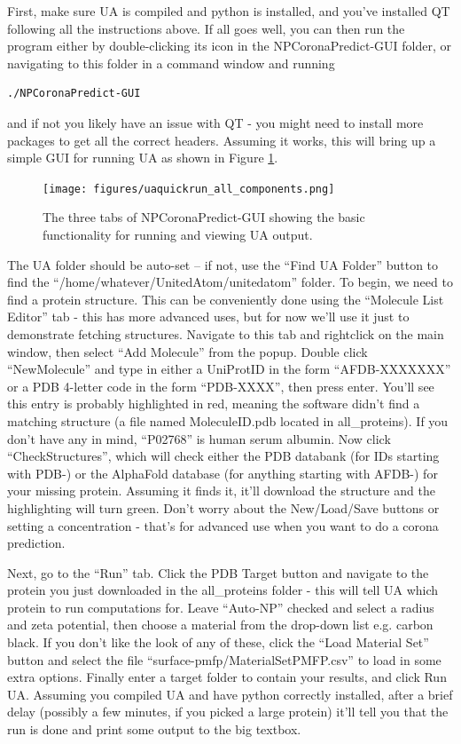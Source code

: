 \documentclass[10pt,a4paper,onecolumn]{report}
\begin{document}
First, make sure UA is compiled and python is installed, and you've installed QT following all the instructions above.  If all goes well, you can then run the program either by double-clicking its icon in the NPCoronaPredict-GUI folder, or navigating to this folder in a command window and running
\begin{lstlisting}
./NPCoronaPredict-GUI
\end{lstlisting}
and if not you likely have an issue with QT - you might need to install more packages to get all the correct headers. Assuming it works, this will bring up a simple GUI for running UA as shown in Figure \ref{fig:uaquickrun_screen}.

\begin{figure} \label{fig:uaquickrun_screen}
    \centering
    \texttt{[image: figures/uaquickrun\_all\_components.png]}
    \caption{The three tabs of NPCoronaPredict-GUI showing the basic functionality for running and viewing UA output.  }
\end{figure}

 The UA folder should be auto-set  -- if not, use the ``Find UA Folder'' button to find the ``/home/whatever/UnitedAtom/unitedatom'' folder. To begin, we need to find a protein structure. This can be conveniently done using the ``Molecule List Editor'' tab - this has more advanced uses, but for now we'll use it just to demonstrate fetching structures. Navigate to this tab and rightclick on the main window, then select ``Add Molecule'' from the popup. Double click ``NewMolecule'' and type in either a UniProtID in the form ``AFDB-XXXXXXX'' or a PDB 4-letter code in the form ``PDB-XXXX'', then press enter. You'll see this entry is probably highlighted in red, meaning the software didn't find a matching structure (a file named MoleculeID.pdb located in all\_proteins). If you don't have any in mind, ``P02768'' is human serum albumin.  Now click ``CheckStructures'', which will check either the PDB databank (for IDs starting with PDB-) or the AlphaFold database (for anything starting with AFDB-) for your missing protein. Assuming it finds it, it'll download the structure and the highlighting will turn green. Don't worry about the New/Load/Save buttons or setting a concentration - that's for advanced use when you want to do a corona prediction.
 
Next, go to the ``Run'' tab. Click the PDB Target button and navigate to the protein you just downloaded in the all\_proteins folder - this will tell UA which protein to run computations for. Leave ``Auto-NP'' checked and select a radius and zeta potential, then choose a material from the drop-down list e.g. carbon black. If you don't like the look of any of these, click the ``Load Material Set'' button and select the file ``surface-pmfp/MaterialSetPMFP.csv'' to load in some extra options.  Finally enter a target folder to contain your results, and click Run UA. Assuming you compiled UA and have python correctly installed, after a brief delay (possibly a few minutes, if you picked a large protein) it'll tell you that the run is done and print some output to the big textbox.
\end{document}
